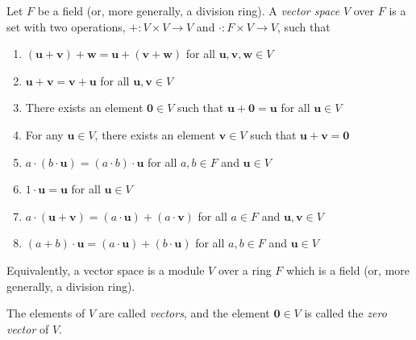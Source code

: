\documentclass{article}
\renewcommand{\u}{\mathbf{u}}
\renewcommand{\v}{\mathbf{v}}
\newcommand{\w}{\mathbf{w}}
\newcommand{\0}{\mathbf{0}}
\begin{document}
Let $F$ be a field (or, more generally, a division ring). A \emph{vector space} $V$ over $F$ is a set with two operations, $+: V \times V \longrightarrow V$ and $\cdot: F \times V \longrightarrow V$, such that
\begin{enumerate}
\item $(\u+\v)+\w = \u+(\v+\w)$ for all $\u,\v,\w \in V$
\item $\u+\v=\v+\u$ for all $\u,\v\in V$
\item There exists an element $\0 \in V$ such that $\u+\0=\u$ for all $\u \in V$
\item For any $\u \in V$, there exists an element $\v \in V$ such that $\u+\v=\0$
\item $a \cdot (b \cdot \u) = (a \cdot b) \cdot \u$ for all $a,b \in F$ and $\u \in V$
\item $1 \cdot \u = \u$ for all $\u \in V$
\item $a \cdot (\u+\v) = (a \cdot \u) + (a \cdot \v)$ for all $a \in F$ and $\u,\v \in V$
\item $(a+b) \cdot \u = (a \cdot \u) + (b \cdot \u)$ for all $a,b \in F$ and $\u \in V$
\end{enumerate}

Equivalently, a vector space is a module $V$ over a ring $F$ which is a field (or, more generally, a division ring).

The elements of $V$ are called \emph{vectors}, and the element $\0 \in V$ is called the \emph{zero vector} of $V$.
\end{document}
